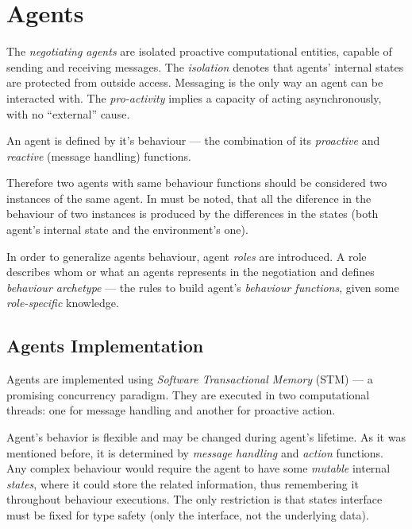 %




\section{Agents}

The \emph{negotiating agents} are isolated proactive computational entities,
capable of sending and receiving messages.
The \emph{isolation} denotes that agents' internal states are protected
from outside access. Messaging is the only way an agent can be interacted with.
The \emph{pro-activity} implies a capacity of acting asynchronously,
with no ``external'' cause.

\medskip

An agent is defined by it's behaviour --- the combination of its
\emph{proactive} and \emph{reactive} (message handling) functions.

Therefore two agents with same behaviour functions should be considered two instances
of the same agent. In must be noted, that all the diference in the behaviour of
two instances is produced by the differences in the states
(both agent's internal state and the environment's one).

\medskip

In order to generalize agents behaviour, agent \emph{roles} are introduced.
A role describes whom or what an agents represents in the negotiation and
defines \emph{behaviour archetype} --- the rules to build
agent's \emph{behaviour functions}, given some \emph{role-specific} knowledge.

\subsection{Agents Implementation}

Agents are implemented using \emph{Software Transactional Memory} (STM)
\cite{STMCode07} --- a promising concurrency paradigm.
They are executed in two computational threads:
one for message handling and another for proactive action.

\medskip

\noindent
Agent's behavior is flexible and may be changed during agent's lifetime.
As it was mentioned before, it is determined by \emph{message handling} and
\emph{action} functions.
Any complex behaviour would require the agent to have some \emph{mutable}
internal \emph{states}, where it could store the related information,
thus remembering it throughout behaviour executions.
The only restriction is that states interface must be fixed for type safety
(only the interface, not the underlying data).


